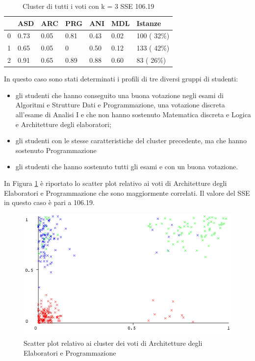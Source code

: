 \documentclass[12pt]{article}
\begin{document}

\begin{table}[ht]
	\centering
	\begin{tabular}{@{}lllllll@{}}
	\toprule
	  & ASD  & ARC  & PRG & ANI  & MDL  & Istanze      \\ \midrule
	0 & 0.73 & 0.05 & 0.81& 0.43 & 0.02 &  100  ( 32\%)\\
	1 & 0.65 & 0.05 & 0   & 0.50 & 0.12 &  133 ( 42\%) \\
	2 & 0.91 & 0.65 & 0.89& 0.88 & 0.60 &  83  ( 26\%) \\ \bottomrule
	\end{tabular}
	\caption{Cluster di tutti i voti con k = 3 SSE 106.19}
	\label{c3V}
\end{table}

In questo caso sono stati determinati i profili di tre diversi gruppi di studenti:

\begin{itemize}
\item gli studenti che hanno conseguito una buona votazione negli esami di Algoritmi e Strutture Dati e Programmazione,
una votazione discreta all'esame di Analisi I e che non hanno sostenuto Matematica discreta e Logica e Architetture degli elaboratori;
\item gli studenti con le stesse caratteristiche del cluster precedente, ma che hanno sostenuto Programmazione
\item gli studenti che hanno sostenuto tutti gli esami e con un buona votazione.
\end{itemize}

In Figura \ref{APC} è riportato lo scatter plot relativo ai voti di Architetture degli Elaboratori e Programmazione che sono
maggiormente correlati. Il valore del SSE in questo caso è pari a 106.19.
\begin{figure}[H]
	\includegraphics[width=\textwidth]{img/ARC-PRG-Cluster.png}
	\captionsetup{justification=centering}
	\caption{Scatter plot relativo ai cluster dei voti di Architetture degli Elaboratori e Programmazione}
	\label{APC}
\end{figure}
\end{document}
